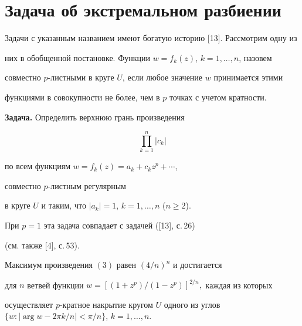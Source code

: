 \section{Задача об экстремальном разбиении}





Задачи с указанным названием имеют богатую историю [13]. Рассмотрим одну из


них в обобщенной постановке. Функции $w=f_k(z)$, $k=1,\dotsc,n$, назовем


совместно $p$-листными в круге $U$, если любое значение $w$ принимается этими


функциями в совокупности не более, чем в $p$ точках с учетом кратности.


\medskip





{\bf Задача.} Определить верхнюю грань произведения


\begin{equation}


\prod\limits_{k=1}^{n}|c_k|


\end{equation}


по всем функциям $w=f_k(z)=a_k+c_kz^p+\dotsb$,


совместно $p$-листным регулярным


в круге $U$ и таким, что $|a_k|=1$, $k=1,\dotsc,n$ ($n\geq 2$).


\medskip





При $p=1$ эта задача совпадает с задачей ([13], с.\,26)


(см. также [4], с.\,53).





\begin{thm}


Максимум произведения $(3)$ равен $(4/n)^n$ и достигается


для $n$ ветвей функции $w=[(1+z^p)/(1-z^p)]^{2/n},$ каждая из которых


осуществляет $p$-кратное накрытие кругом $U$ одного из углов $\{w:|\arg w-2\pi


k/n|<\pi/n\}$, $k=1,\dotsc,n.$


\end{thm}





